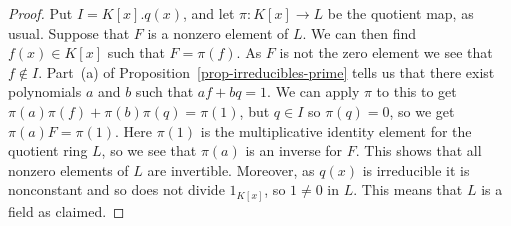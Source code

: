 \documentclass{amsart}
\renewcommand{\:}{\colon}
\theoremstyle{definition}
\begin{document}
\begin{proof}
 Put $I=K[x].q(x)$, and let $\pi\:K[x]\to L$ be the quotient map, as
 usual.  Suppose that $F$ is a nonzero element of $L$.  We can then
 find $f(x)\in K[x]$ such that $F=\pi(f)$.  As $F$ is not the zero
 element we see that $f\not\in I$.  Part~(a) of
 Proposition~\ref{prop-irreducibles-prime} tells us that there exist
 polynomials $a$ and $b$ such that $af+bq=1$.  We can apply $\pi$ to
 this to get $\pi(a)\pi(f)+\pi(b)\pi(q)=\pi(1)$, but $q\in I$ so
 $\pi(q)=0$, so we get $\pi(a)F=\pi(1)$.  Here $\pi(1)$ is the
 multiplicative identity element for the quotient ring $L$, so we see
 that $\pi(a)$ is an inverse for $F$.  This shows that all nonzero
 elements of $L$ are invertible.  Moreover, as $q(x)$ is irreducible
 it is nonconstant and so does not divide $1_{K[x]}$, so $1\neq 0$ in
 $L$.  This means that $L$ is a field as claimed.
\end{proof}
\end{document}
